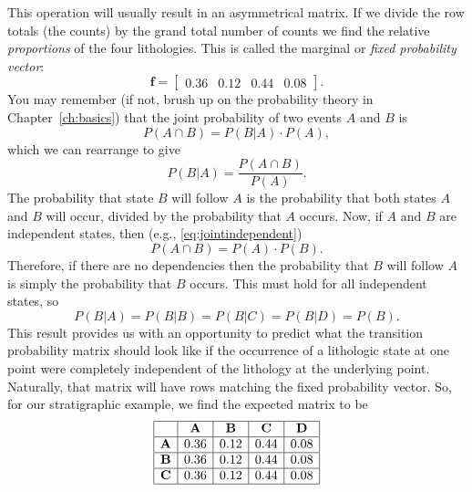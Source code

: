\begin{example}
This operation will usually result in an asymmetrical matrix.  If we divide the row totals (the 
counts) by the grand total number of counts we find the relative \emph{proportions} of the four lithologies.  
This is called the marginal or \emph{fixed probability vector}:
\begin{equation}
\mathbf{f} = 
\left [ \begin{array}{cccc}
0.36 & 0.12 & 0.44 & 0.08
\end{array}
\right ].
\end{equation}
You may remember (if not, brush up on the probability theory in Chapter~\ref{ch:basics}) that the joint probability of two events 
$A$ and $B$ is
\begin{equation}
P(A \cap B) = P(B|A)\cdot P(A),
\end{equation}
which we can rearrange to give
\begin{equation}
P(B|A) = \frac{P(A \cap B)}{P(A)}.
\end{equation}
The probability that state $B$ will follow $A$ is the probability that both states $A$ and $B$ will occur,
divided by the probability that $A$ occurs.  Now, if $A$ and $B$ are independent states, then (e.g., \ref{eq:jointindependent})
\begin{equation}
P(A \cap B) = P(A) \cdot P(B).
\end{equation}
Therefore, if there are no dependencies then the probability that $B$ will follow $A$ is simply the 
probability that $B$ occurs.  This must hold for all independent states, so
\begin{equation}
P(B|A) = P(B|B)  = P(B|C) = P(B|D) = P(B).
\end{equation}
This result provides us with an opportunity to predict what the transition probability matrix should look 
like if the occurrence of a lithologic state at one point were completely independent of the 
lithology at the underlying point.  Naturally, that matrix will have rows matching the fixed 
probability vector.  So, for our stratigraphic example, we find the expected matrix to be
$$
\begin{array}
{|c|c|c|c|c|} \hline
 & \bf{A} & \bf{B} & \bf{C} & \bf{D} \\ \hline
\bf{A} & 0.36 & 0.12 & 0.44 & 0.08  \\ \hline
\bf{B} & 0.36 & 0.12 & 0.44 & 0.08 \\ \hline
\bf{C} & 0.36 & 0.12 & 0.44 &  0.08 \\ \hline

\end{array}$$
\end{example}
